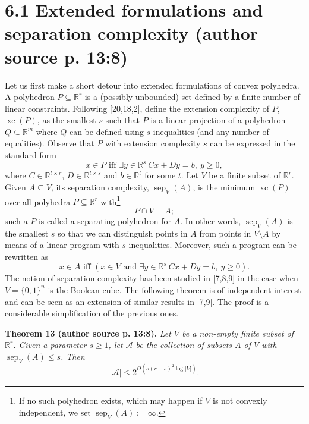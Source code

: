 \documentclass[10pt,a4paper]{article}
\newcommand{\xc}{\operatorname{xc}}
\newcommand{\sep}{\operatorname{sep}}
\newcommand{\RR}{\mathbb R}
\newenvironment{originalresult}[1]{\par\medskip\noindent\textbf{#1.}\itshape}{\par\medskip}
\begin{document}
\section*{6.1 Extended formulations and separation complexity (author source p. 13:8)}
Let us first make a short detour into extended formulations of convex polyhedra.
A polyhedron $P\subseteq\RR^r$ is a (possibly unbounded) set defined by a finite number of linear constraints. Following [20,18,2], define the extension complexity of $P$, $\xc(P)$, as the smallest $s$ such that $P$ is a linear projection of a polyhedron $Q\subseteq\RR^m$ where $Q$ can be defined using $s$ inequalities (and any number of equalities). Observe that $P$ with extension complexity $s$ can be expressed in the standard form
\[x\in P\text{ iff }\exists y\in\RR^s\ Cx+Dy=b,\ y\ge0,\]
where $C\in\RR^{t\times r}$, $D\in\RR^{t\times s}$ and $b\in\RR^t$ for some $t$.
Let $V$ be a finite subset of $\RR^r$. Given $A\subseteq V$, its separation complexity, $\sep_V(A)$, is the minimum $\xc(P)$ over all polyhedra $P\subseteq\RR^r$ with\footnote{If no such polyhedron exists, which may happen if $V$ is not convexly independent, we set $\sep_V(A):=\infty$.}
\[P\cap V=A;\]
such a $P$ is called a separating polyhedron for $A$. In other words, $\sep_V(A)$ is the smallest $s$ so that we can distinguish points in $A$ from points in $V\setminus A$ by means of a linear program with $s$ inequalities. Moreover, such a program can be rewritten as
\[x\in A\text{ iff }(x\in V\text{ and }\exists y\in\RR^s\ Cx+Dy=b,\ y\ge0).\]
The notion of separation complexity has been studied in [7,8,9] in the case when $V=\{0,1\}^n$ is the Boolean cube. The following theorem is of independent interest and can be seen as an extension of similar results in [7,9]. The proof is a considerable simplification of the previous ones.

\begin{originalresult}{Theorem 13 (author source p. 13:8)}
Let $V$ be a non-empty finite subset of $\RR^r$. Given a parameter $s\ge1$, let $\mathcal A$ be the collection of subsets $A$ of $V$ with $\sep_V(A)\le s$. Then
\[|\mathcal A|\le2^{O(s(r+s)^2\log|V|)}.\]
\end{originalresult}
\end{document}

